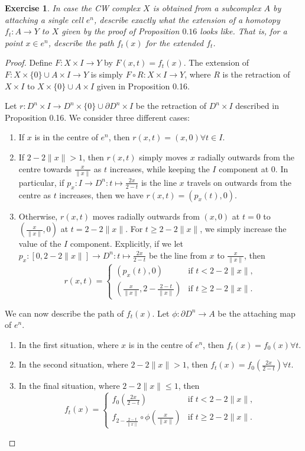 \documentclass{article}
\newtheorem{exercise}[theorem]{Exercise}
\begin{document}
\begin{exercise}
In case the CW complex $X$ is obtained from a subcomplex $A$ by attaching a single cell $e^n$, describe exactly what the extension of a homotopy $f_t:A\to Y$ to $X$ given by the proof of Proposition $0.16$ looks like. That is, for a point $x\in e^n$, describe the path $f_t(x)$ for the extended $f_t$.
\end{exercise}
\begin{proof}
Define $F:X\times I\to Y$ by $F(x,t)=f_t(x)$. The extension of $F:X\times\{0\}\cup A\times I\to Y$ is simply $F\circ R:X\times I\to Y$, where $R$ is the retraction of $X\times I$ to $X\times\{0\}\cup A\times I$ given in Proposition 0.16.

Let $r:D^n\times I\to D^n\times\{0\}\cup \partial D^n\times I$ be the retraction of $D^n\times I$ described in Proposition 0.16. 
We consider three different cases:
\begin{enumerate}
\item If $x$ is in the centre of $e^n$, then $r(x,t)=(x,0)\forall t\in I$. 
\item If $2-2\|x\|> 1$, then $r(x,t)$ simply moves $x$ radially outwards from the centre towards $\frac{x}{\|x\|}$ as $t$ increases, while keeping the $I$ component at $0$. In particular, if $p_x:I\to D^n:t\mapsto\frac{2x}{2-t}$ is the line $x$ travels on outwards from the centre as $t$ increases, then we have $r(x,t)=(p_x(t),0)$.
\item Otherwise,  $r(x,t)$ moves radially outwards from $(x,0)$ at $t=0$ to $\left(\frac{x}{\|x\|},0\right)$ at $t=2-2\|x\|$. For $t\geq2-2\|x\|$, we simply increase the value of the $I$ component. Explicitly, if we let $p_x:[0,2-2\|x\|]\to D^n:t\mapsto\frac{2x}{2-t}$ be the line from $x$ to $\frac{x}{\|x\|}$, then\[r(x,t)=\begin{cases}
    (p_x(t),0)&\text{if }t< 2-2\|x\|,\\
    \left(\frac{x}{\|x\|},2-\frac{2-t}{\|x\|}\right)&\text{if }t\geq2-2\|x\|.
\end{cases}\]
\end{enumerate}
We can now describe the path of $f_t(x)$. Let $\phi:\partial D^n\to A$ be the attaching map of $e^n$.
\begin{enumerate}
\item In the first situation, where $x$ is in the centre of $e^n$, then $f_t(x)=f_0(x)\forall t$.
\item In the second situation, where $2-2\|x\|> 1$, then $f_t(x)=f_0\left(\frac{2x}{2-t}\right)\forall t$.
\item In the final situation, where $2-2\|x\|\leq 1$, then\[f_t(x)=\begin{cases}
    f_0\left(\frac{2x}{2-t}\right)&\text{if }t<2-2\|x\|,\\
    f_{2-\frac{2-t}{\|x\|}}\circ\phi\left(\frac{x}{\|x\|}\right)&\text{if }t\geq 2-2\|x\|.
\end{cases}\]
\end{enumerate}
\end{proof}
\end{document}
